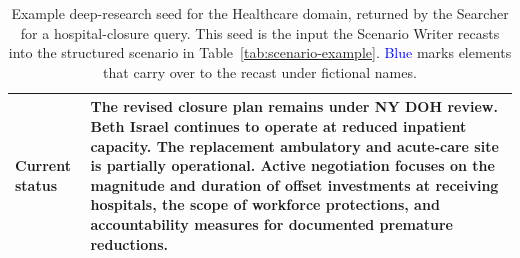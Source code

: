 \begin{table}[p]
\begin{tabularx}{\textwidth}{@{}l X@{}}
\midrule
\textbf{Current status} &
The revised closure plan remains under NY DOH review. Beth Israel continues to operate at reduced inpatient capacity. The replacement ambulatory and acute-care site is partially operational. Active negotiation focuses on the magnitude and duration of offset investments at receiving hospitals, the scope of workforce protections, and accountability measures for documented premature reductions. \\
\bottomrule
\end{tabularx}
\caption{Example deep-research seed for the Healthcare domain, returned by the Searcher for a hospital-closure query. This seed is the input the Scenario Writer recasts into the structured scenario in Table~\ref{tab:scenario-example}. \textcolor{blue}{Blue} marks elements that carry over to the recast under fictional names.}
\label{tab:seed-example}
\end{table}


